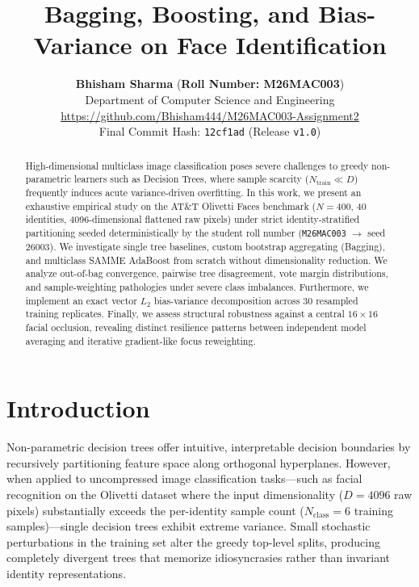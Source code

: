 \documentclass[10pt,twocolumn,letterpaper]{article}
\begin{document}
\title{Bagging, Boosting, and Bias-Variance on Face Identification}

\author{
\textbf{Bhisham Sharma} \quad (\textbf{Roll Number: M26MAC003})\\
Department of Computer Science and Engineering\\
\url{https://github.com/Bhisham444/M26MAC003-Assignment2}\\
Final Commit Hash: \texttt{12cf1ad} (Release \texttt{v1.0})
}

\maketitle

\begin{abstract}
High-dimensional multiclass image classification poses severe challenges to greedy non-parametric learners such as Decision Trees, where sample scarcity ($N_{\text{train}} \ll D$) frequently induces acute variance-driven overfitting. In this work, we present an exhaustive empirical study on the AT\&T Olivetti Faces benchmark ($N=400$, 40 identities, 4096-dimensional flattened raw pixels) under strict identity-stratified partitioning seeded deterministically by the student roll number (\texttt{M26MAC003} $\to$ seed $26003$). We investigate single tree baselines, custom bootstrap aggregating (Bagging), and multiclass SAMME AdaBoost from scratch without dimensionality reduction. We analyze out-of-bag convergence, pairwise tree disagreement, vote margin distributions, and sample-weighting pathologies under severe class imbalances. Furthermore, we implement an exact vector $L_2$ bias-variance decomposition across 30 resampled training replicates. Finally, we assess structural robustness against a central $16 \times 16$ facial occlusion, revealing distinct resilience patterns between independent model averaging and iterative gradient-like focus reweighting.
\end{abstract}

\section{Introduction}
Non-parametric decision trees offer intuitive, interpretable decision boundaries by recursively partitioning feature space along orthogonal hyperplanes. However, when applied to uncompressed image classification tasks—such as facial recognition on the Olivetti dataset where the input dimensionality ($D = 4096$ raw pixels) substantially exceeds the per-identity sample count ($N_{\text{class}} = 6$ training samples)—single decision trees exhibit extreme variance. Small stochastic perturbations in the training set alter the greedy top-level splits, producing completely divergent trees that memorize idiosyncrasies rather than invariant identity representations.
\end{document}
